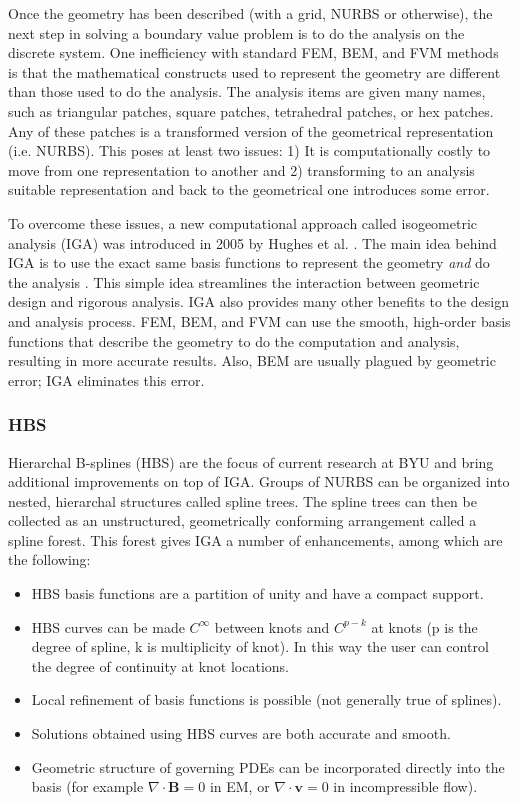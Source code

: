       Once the geometry has been described (with a grid, NURBS or otherwise), the next step in solving a boundary value problem is to do the analysis on the discrete system. One inefficiency with standard FEM, BEM, and FVM methods is that the mathematical constructs used to represent the geometry are different than those used to do the analysis. The analysis items are given many names, such as triangular patches, square patches, tetrahedral patches, or hex patches. Any of these patches is a transformed version of the geometrical representation (i.e. NURBS). This poses at least two issues: 1) It is computationally costly to move from one representation to another and 2) transforming to an analysis suitable representation and back to the geometrical one introduces some error.

      To overcome these issues, a new computational approach called isogeometric analysis (IGA) was introduced in 2005 by Hughes et al. \cite{hughes2005}. The main idea behind IGA is to use the exact same basis functions to represent the geometry \textit{and} do the analysis \cite{scott2013}. This simple idea streamlines the interaction between geometric design and rigorous analysis. IGA also provides many other benefits to the design and analysis process. FEM, BEM, and FVM can use the smooth, high-order basis functions that describe the geometry to do the computation and analysis, resulting in more accurate results. Also, BEM are usually plagued by geometric error; IGA eliminates this error.

      \subsubsection{HBS} \label{ssub:hbs}

        Hierarchal B-splines (HBS) are the focus of current research at BYU and bring additional improvements on top of IGA. Groups of NURBS can be organized into nested, hierarchal structures called spline trees.  The spline trees can then be collected as an unstructured, geometrically conforming arrangement called a spline forest. This forest gives IGA a number of enhancements, among which are the following:

    \begin{itemize}
      \item HBS basis functions are a partition of unity and have a compact support.
      \item HBS curves can be made $C^{\infty}$ between knots and $C^{p-k}$ at knots (p is the degree of spline, k is multiplicity of knot). In this way the user can control the degree of continuity at knot locations.
      \item Local refinement of basis functions is possible (not generally true of splines).
      \item Solutions obtained using HBS curves are both accurate and smooth.
      \item Geometric structure of governing PDEs can be incorporated directly into the basis (for example $\nabla\cdot\mathbf{B} = 0$ in EM, or $\nabla\cdot\mathbf{v} = 0$ in incompressible flow).
    \end{itemize}
    \mainstretch{}

